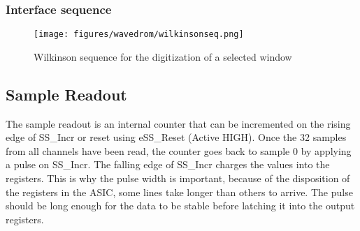 \subsubsection*{Interface sequence}
\begin{figure}[H]
\centering
\texttt{[image: figures/wavedrom/wilkinsonseq.png]}\\
\caption{\label{fig:wilkinsonseq} Wilkinson sequence for the digitization of a selected window}
\end{figure}

\subsection{Sample Readout}
The sample readout is an internal counter that can be incremented on the rising edge of SS\_Incr or reset using eSS\_Reset (Active HIGH). Once the 32 samples from all channels have been read, the counter goes back to sample 0 by applying a pulse on SS\_Incr. The falling edge of SS\_Incr charges the values into the registers. This is why the pulse width is important, because of the disposition of the registers in the ASIC, some lines take longer than others to arrive. The pulse should be long enough for the data to be stable before latching it into the output registers.

